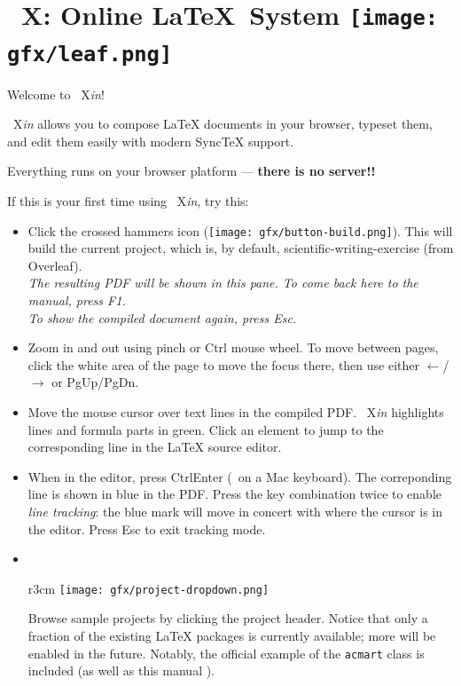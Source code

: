 \documentclass{article}
\newcommand\ToXinB{\mbox{%
    \raisebox{0.4pt}{T}\hspace{-1pt}\raisebox{1pt}{o}%
    \hspace{-1.6pt}X\hspace{-1pt}{\itshape in}}}
\newcommand\ToXin{\mbox{%
    \raisebox{0.5pt}{T}\hspace{-.8pt}\raisebox{1pt}{o}%
    \hspace{-1pt}X{\hspace{-1pt}\itshape in}}}
\newcommand\keyplus{\raisebox{.7pt}{\fontsize{8}{8}\selectfont+}}
\newcommand\myreturn{\fontsize{9}{9}\selectfont\return}
\newcommand\smiley{\raisebox{-1.3pt}{\texttt{[image: gfx/smiley.png]}}}
\begin{document}
\section*{\ToXinB: Online \LaTeX\ System\hfill
\texttt{[image: gfx/leaf.png]}~
}

Welcome to \ToXin!

\bigskip\noindent
{\ToXin} allows you to compose {\LaTeX} documents in your browser, typeset them,
and edit them easily with modern Sync{\TeX} support.

\bigskip\noindent
Everything runs on your browser platform ---
\textbf{there is no server!!}

\bigskip\noindent
If this is your first time using {\ToXin},
try this:

\begin{itemize}
\item Click the crossed hammers icon
 (\texttt{[image: gfx/button-build.png]}).
 This will build the current project,
 which is, by default, \textsf{scientific-writing-exercise} (from Overleaf). \\[.2em]
 \textit{The resulting PDF will be shown in this pane. To come back here to the manual, press {\rm F1}.}\\[.2em]
 \textit{To show the compiled document again, press {\rm Esc}.}

 
\item Zoom in and out using pinch or Ctrl{\,\keyplus\,}mouse wheel.
To move between pages, click the white area of the page to move the focus there,
then use either $\leftarrow$/$\rightarrow$
or PgUp/PgDn.
 
\item Move the mouse cursor over text lines in the compiled PDF.
{\ToXin} highlights lines and formula parts in green.
Click an element to jump to the corresponding line in the {\LaTeX} source editor.

\item When in the editor, press Ctrl\keyplus Enter ({\cmd\keyplus\myreturn\,} on a Mac keyboard).
The correponding line is shown in blue in the PDF.
Press the key combination twice to enable \emph{line tracking}: the blue mark will move in concert with where the cursor is in the editor.
Press Esc to exit tracking mode.

\item 
\begin{minipage}[t]{4in}
~
\begin{wrapfigure}[7]{r}{3cm}
\vspace{-3.2em}
\texttt{[image: gfx/project-dropdown.png]}
\end{wrapfigure}
\vspace{-2.4em}

Browse sample projects by clicking the project header.
Notice that only a fraction of the existing
{\LaTeX} packages is currently available;
more will be enabled in the future.
Notably, the official example of the
\texttt{acmart} class is included (as well as this manual \smiley).
\end{minipage}


\end{itemize}
\end{document}
